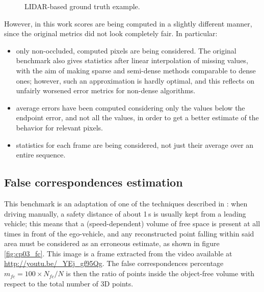 \begin{figure}[h!]
        \caption{\ac{LIDAR}-based ground truth example.}\label{fig:cp03_lidarGT}
\end{figure}

However, in this work scores are being computed in a slightly different manner, since the original metrics did not look completely fair. In particular:
\begin{itemize}
\item only non-occluded, computed pixels are being considered. The original benchmark also gives statistics after linear interpolation of missing values, with the aim of making sparse and semi-dense methods comparable to dense ones; however, such an approximation is hardly optimal, and this reflects on unfairly worsened error metrics for non-dense algorithms.
\item average errors have been computed considering only the values below the endpoint error, and not all the values, in order to get a better estimate of the behavior for relevant pixels.
\item statistics for each frame are being considered, not just their average over an entire sequence.
\end{itemize}

\subsection{False correspondences estimation}\label{ch:chapter03_01_02}

This benchmark is an adaptation of one of the techniques described in \cite{Steingrube2009}: when driving manually, a safety distance of about 1\,s is usually kept from a leading vehicle; this means that a (speed-dependent) volume of free space is present at all times in front of the ego-vehicle, and any reconstructed point falling within said area must be considered as an erroneous estimate, as shown in figure \ref{fig:cp03_fc}. This image is a frame extracted from the video available at \url{http://youtu.be/_YEj_gf95Qg}. The false correspondences percentage $m_{fc} = 100 \times N_{fc} / N$ is then the ratio of points inside the object-free volume with respect to the total number of 3D points. 

